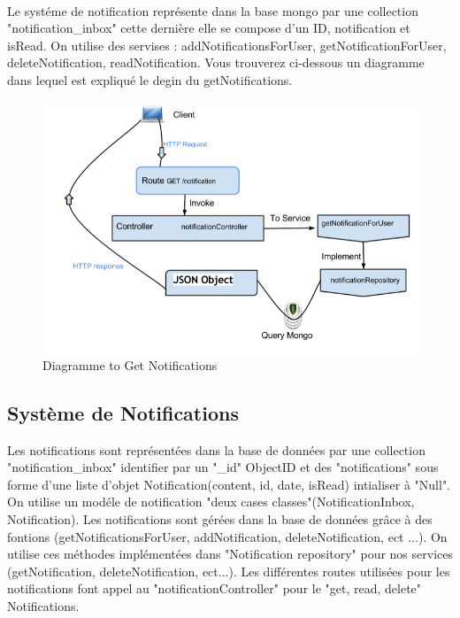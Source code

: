 \paragraph{}
Le systéme de notification représente dans la base mongo par une collection "notification\_inbox" cette dernière elle se compose d'un ID, notification et isRead.
On utilise des servises : addNotificationsForUser, getNotificationForUser, deleteNotification, readNotification.
Vous trouverez ci-dessous un diagramme dans lequel est expliqué le degin du getNotifications.
\begin{figure}[H]
        \centering
                \centering
                \includegraphics[width=\textwidth]{Notifications.png}
               \caption{Diagramme to Get Notifications}
		\label{fig:Diagramme to Get Notifications}
\end{figure}
\subsection{Système de Notifications}
Les notifications sont représentées dans la base de données par une collection "notification\_inbox" identifier par un "\_id" ObjectID et des "notifications" sous forme d'une liste d'objet Notification(content, id, date, isRead) intialiser à "Null".
On utilise un modéle de notification "deux cases classes"(NotificationInbox, Notification).
Les notifications sont gérées dans la base de données grâce à des fontions (getNotificationsForUser, addNotification, deleteNotification, ect ...).
On utilise ces méthodes implémentées dans "Notification repository" pour nos services (getNotification, deleteNotification, ect...).
Les différentes routes utilisées pour les notifications font appel au "notificationController" pour le "get, read, delete" Notifications.
